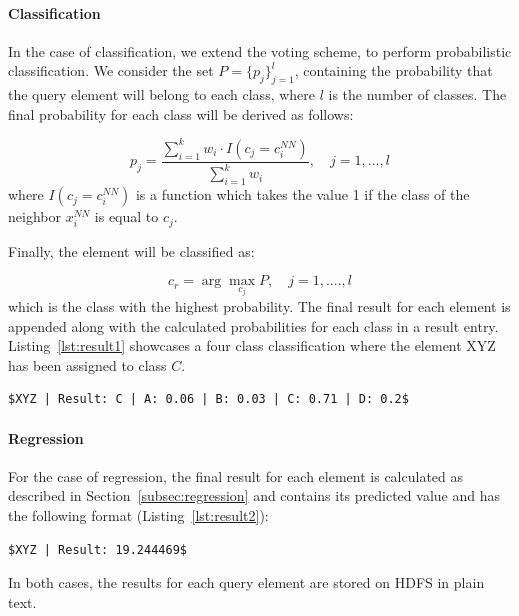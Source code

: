 \paragraph{Classification} In the case of classification, we extend the voting scheme, to perform probabilistic classification. We consider the set $P = \{p_{j}\}_{j=1}^{l}$, containing the probability that the query element will belong to each class, where $l$ is the number of classes. The final probability for each class will be derived as follows:

\begin{equation}
	p_{j} = \frac{\sum_{i=1}^{k} w_{i} \cdot I(c_{j} = c_{i}^{NN})}{\sum_{i=1}^{k} w_{i}}, \quad j=1, ..., l
\end{equation}
where $I(c_{j} = c_{i}^{NN})$ is a function which takes the value 1 if the class of the neighbor $x_{i}^{NN}$ is equal to $c_{j}$. 

Finally, the element will be classified as:

\begin{equation} 
	c_{r} = \arg \max_{c_{j}} P, \quad j=1, ...., l
\end{equation}
which is the class with the highest probability. The final result for each element is appended along with the calculated probabilities for each class in a result entry. Listing~\ref{lst:result1} showcases a four class classification where the element XYZ has been assigned to class $C$.

\begin{lstlisting}[caption={The element XYZ is classified to class C, which has the highest probability.}, label={lst:result1}, mathescape=true]
$XYZ | Result: C | A: 0.06 | B: 0.03 | C: 0.71 | D: 0.2$
\end{lstlisting}

\paragraph{Regression} For the case of regression, the final result for each element is calculated as described in Section~\ref{subsec:regression} and contains its predicted value and has the following format (Listing~\ref{lst:result2}):

\begin{lstlisting}[caption={The value estimation of element XYZ.}, label={lst:result2}, mathescape=true]
$XYZ | Result: 19.244469$
\end{lstlisting}

In both cases, the results for each query element are stored on HDFS in plain text.

